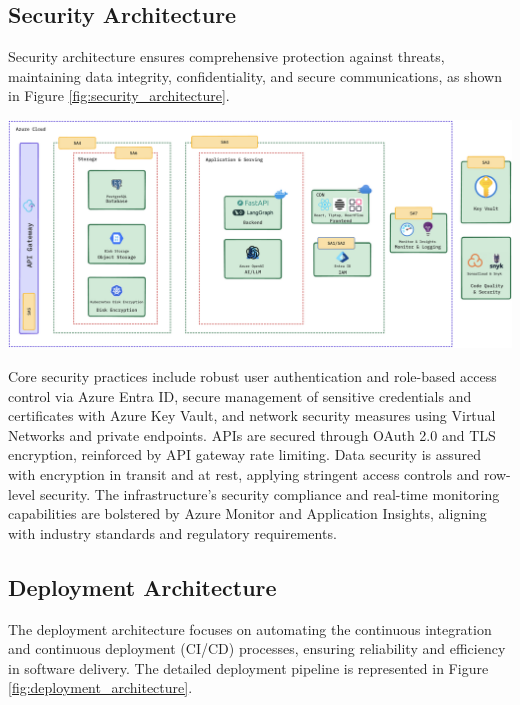 \subsection{Security Architecture}
Security architecture ensures comprehensive protection against threats, maintaining data integrity, confidentiality, and secure communications, as shown in Figure \ref{fig:security_architecture}.

\begin{center}
    \centering
    \includegraphics[width=1\textwidth]{Images/Security Architecture.png}
    \label{fig:security_architecture}
\end{center}

Core security practices include robust user authentication and role-based access control via Azure Entra ID, secure management of sensitive credentials and certificates with Azure Key Vault, and network security measures using Virtual Networks and private endpoints. APIs are secured through OAuth 2.0 and TLS encryption, reinforced by API gateway rate limiting. Data security is assured with encryption in transit and at rest, applying stringent access controls and row-level security. The infrastructure’s security compliance and real-time monitoring capabilities are bolstered by Azure Monitor and Application Insights, aligning with industry standards and regulatory requirements.

\subsection{Deployment Architecture}
The deployment architecture focuses on automating the continuous integration and continuous deployment (CI/CD) processes, ensuring reliability and efficiency in software delivery. The detailed deployment pipeline is represented in Figure \ref{fig:deployment_architecture}.

